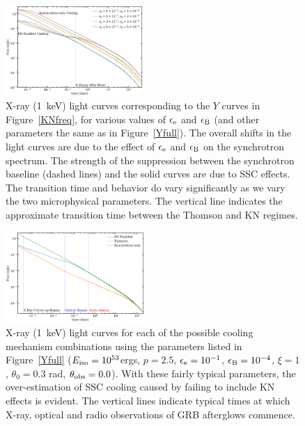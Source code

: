 \documentclass[fleqn,usenatbib]{mnras}
\begin{document}
\begin{figure}
    \includegraphics[width=0.465\textwidth]{images/XRT.png}
    \caption{X-ray (1~keV) light curves corresponding to the $Y$ curves in Figure~\ref{KNfreq}, for various values of $\epsilon_{\rm e}$ and $\epsilon_{\rm B}$ (and other parameters the same as in Figure~\ref{Yfull}). The overall shifts in the light curves are due to the effect of $\epsilon_{\rm e}$ and $\epsilon_{\rm B}$ on the synchrotron spectrum. The strength of the suppression between the synchrotron baseline (dashed lines) and the solid curves are due to SSC effects. The transition time and behavior do vary significantly as we vary the two microphysical parameters. The vertical line indicates the approximate transition time between the Thomson and KN regimes.}
    \label{xrteeeb1e3}
\end{figure}

\begin{figure}
    \includegraphics[width=0.47\textwidth]{images/XRT_on-axis-3.png}
    \caption{X-ray (1~keV) light curves for each of the possible cooling mechanism combinations using the parameters listed in Figure~\ref{Yfull} ($E_{\rm iso}=10^{53}$ergs, $p=2.5$, $\epsilon_{\rm e}=10^{-1}$, $\epsilon_{\rm B}=10^{-4}$, $\xi=1$, $\theta_0=0.3$ rad, $\theta_{\rm obs}=0.0$). With these fairly typical parameters, the over-estimation of SSC cooling caused by failing to include KN effects is evident. The vertical lines indicate typical times at which X-ray, optical and radio observations of GRB afterglows commence.}
    \label{xrt3}
\end{figure}
\end{document}
